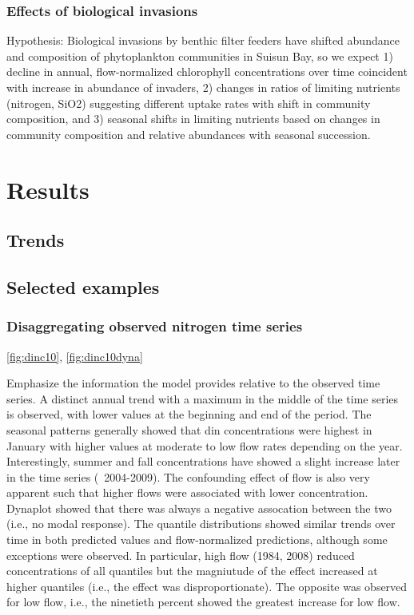 \documentclass[letterpaper,12pt,oneside]{article}\usepackage[]{graphicx}\usepackage[]{color}
\begin{document}
\subsubsection{Effects of biological invasions}
Hypothesis: Biological invasions by benthic filter feeders have shifted abundance and composition of phytoplankton communities in Suisun Bay, so we expect 1) decline in annual, flow-normalized chlorophyll concentrations over time coincident with increase in abundance of invaders, 2) changes in ratios of limiting nutrients (nitrogen, SiO2) suggesting different uptake rates with shift in community composition, and 3) seasonal shifts in limiting nutrients based on changes in community composition and relative abundances with seasonal succession.

\section{Results}

\subsection{Trends}

\subsection{Selected examples}

\subsubsection{Disaggregating observed nitrogen time series}

\cref{fig:dinc10}, \cref{fig:dinc10dyna}

Emphasize the information the model provides relative to the observed time series.  A distinct annual trend with a maximum in the middle of the time series is observed, with lower values at the beginning and end of the period.  The seasonal patterns generally showed that \ac{din} concentrations were highest in January with higher values at moderate to low flow rates depending on the year. Interestingly, summer and fall concentrations have showed a slight increase later in the time series (~2004-2009).  The confounding effect of flow is also very apparent such that higher flows were associated with lower concentration.  Dynaplot showed that there was always a negative assocation between the two (i.e., no modal response).  The quantile distributions showed similar trends over time in both predicted values and flow-normalized predictions, although some exceptions were observed.  In particular, high flow (1984, 2008) reduced concentrations of all quantiles but the magniutude of the effect increased at higher quantiles (i.e., the effect was disproportionate).  The opposite was observed for low flow, i.e., the ninetieth percent showed the greatest increase for low flow.     
\end{document}
